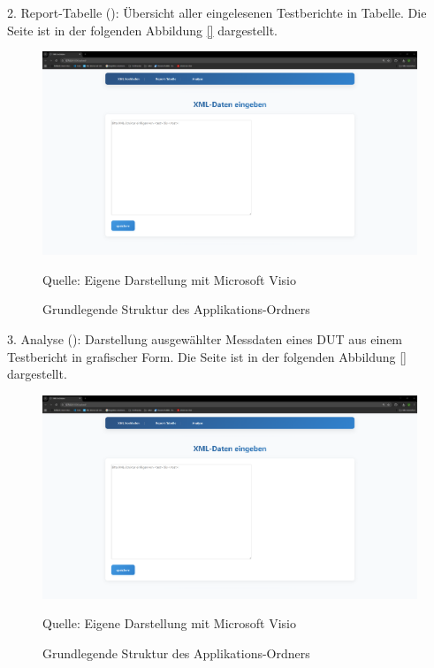 2. Report-Tabelle (): Übersicht aller eingelesenen Testberichte in Tabelle.
Die Seite ist in der folgenden Abbildung \ref{} dargestellt.

\begin{figure}[H]
    \centering
    \includegraphics[width=1\textwidth]{Grafiken/Bild XML hochladen.png}
    \caption{Grundlegende Struktur des Applikations-Ordners}
    \label{fig: 343}
    {Quelle: Eigene Darstellung mit Microsoft Visio}
\end{figure}

3. Analyse (): Darstellung ausgewählter Messdaten eines DUT aus einem Testbericht in grafischer Form.
Die Seite ist in der folgenden Abbildung \ref{} dargestellt.

\begin{figure}[H]
    \centering
    \includegraphics[width=1\textwidth]{Grafiken/Bild XML hochladen.png}
    \caption{Grundlegende Struktur des Applikations-Ordners}
    \label{fig: 12}
    {Quelle: Eigene Darstellung mit Microsoft Visio}
\end{figure}

